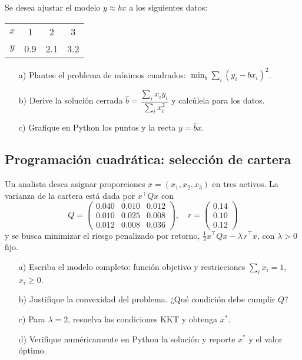 \documentclass[12pt]{article}
\begin{document}
Se desea ajustar el modelo $y \approx b x$ a los siguientes datos:
\begin{center}
\begin{tabular}{cccc}
\toprule
$x$ & 1 & 2 & 3 \\
$y$ & 0.9 & 2.1 & 3.2 \\
\bottomrule
\end{tabular}
\end{center}
\begin{itemize}
    \item[a)] Plantee el problema de mínimos cuadrados: $\min_b \sum_i (y_i - b x_i)^2$.
    \item[b)] Derive la solución cerrada $\hat b = \dfrac{\sum_i x_i y_i}{\sum_i x_i^2}$ y calcúlela para los datos.
    \item[c)] Grafique en Python los puntos y la recta $y=\hat b x$.
\end{itemize}

\subsection{Programación cuadrática: selección de cartera}

Un analista desea asignar proporciones $x = (x_1, x_2, x_3)$ en tres activos. La varianza de la cartera está dada por $x^\top Q x$ con
\[
Q = \begin{pmatrix}
0.040 & 0.010 & 0.012 \\
0.010 & 0.025 & 0.008 \\
0.012 & 0.008 & 0.036
\end{pmatrix},\quad r = \begin{pmatrix}0.14 \\ 0.10 \\ 0.12\end{pmatrix}
\]
y se busca minimizar el riesgo penalizado por retorno, $\tfrac{1}{2} x^\top Q x - \lambda\, r^\top x$, con $\lambda>0$ fijo.
\begin{itemize}
    \item[a)] Escriba el modelo completo: función objetivo y restricciones $\sum_i x_i = 1$, $x_i \ge 0$.
    \item[b)] Justifique la convexidad del problema. ¿Qué condición debe cumplir $Q$?
    \item[c)] Para $\lambda = 2$, resuelva las condiciones KKT y obtenga $x^*$.
    \item[d)] Verifique numéricamente en Python la solución y reporte $x^*$ y el valor óptimo.
\end{itemize}
\end{document}
